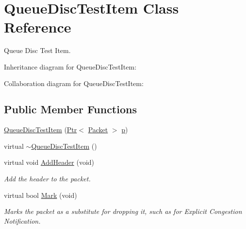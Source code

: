 \hypertarget{classQueueDiscTestItem}{}\section{Queue\+Disc\+Test\+Item Class Reference}
\label{classQueueDiscTestItem}


Queue Disc Test Item.  




Inheritance diagram for Queue\+Disc\+Test\+Item\+:


Collaboration diagram for Queue\+Disc\+Test\+Item\+:
\subsection*{Public Member Functions}
\begin{DoxyCompactItemize}
\item 
\hyperlink{classQueueDiscTestItem_a7d4754b7ad4574733d09831428c1ca4d}{Queue\+Disc\+Test\+Item} (\hyperlink{classns3_1_1Ptr}{Ptr}$<$ \hyperlink{classns3_1_1Packet}{Packet} $>$ \hyperlink{lte__link__budget__x2__handover__measures_8m_ac9de518908a968428863f829398a4e62}{p})
\item 
virtual \hyperlink{classQueueDiscTestItem_ae0a683b11abd688b427b23471ec4f688}{$\sim$\+Queue\+Disc\+Test\+Item} ()
\item 
virtual void \hyperlink{classQueueDiscTestItem_a8111acf25d313f74263c4359cb752ecd}{Add\+Header} (void)
\begin{DoxyCompactList}\small\item\em Add the header to the packet. \end{DoxyCompactList}\item 
virtual bool \hyperlink{classQueueDiscTestItem_a4308d5af49b759e2adb3bb28b8da5bab}{Mark} (void)
\begin{DoxyCompactList}\small\item\em Marks the packet as a substitute for dropping it, such as for Explicit Congestion Notification. \end{DoxyCompactList}\end{DoxyCompactItemize}
